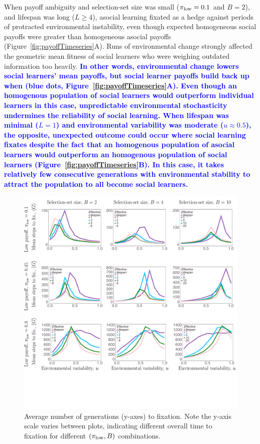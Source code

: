 \documentclass[letterpaper,11.5pt]{scrartcl}
\newcommand{\edit}[1]{{\bfseries \textcolor{blue} {#1}}}
\begin{document}
When payoff ambiguity and selection-set size was small ($\pi_{\mathrm{low}}=0.1$ and $B=2$), and lifespan was long ($L \geq 4$), asocial learning fixated as a hedge against periods of protracted environmental instability, even though expected
homogeneous social payoffs were greater than homogeneous asocial payoffs (Figure~\ref{fig:payoffTimeseries}A). Runs of environmental change strongly affected the geometric mean fitness of social learners who were weighing
outdated information too heavily. \edit{In other words, environmental change lowers social learners' mean payoffs, but social learner payoffs build back up when (blue dots, Figure~\ref{fig:payoffTimeseries}A).  Even though an homogenous population of social learners would outperform individual learners in this case, unpredictable environmental stochasticity undermines the reliability of social learning.  When lifespan was minimal ($L=1$) and environmental variability was moderate ($u\approx0.5$), the opposite, unexpected outcome could occur where social learning fixates despite the fact that an homogenous population of asocial learners would outperform an homogenous population of social learners (Figure~\ref{fig:payoffTimeseries}B). In this case, it takes relatively few consecutive generations with environmental stability to attract the population to all become social learners.}

\begin{figure}
  \caption{Average number of generations (y-axes) to fixation. 
    Note the y-axis scale varies between plots, indicating different overall 
    time to fixation for different $(\pi_{\mathrm{low}}, B)$ combinations.} 
  \label{fig:steps}
\centering
    \includegraphics[width=\textwidth]{Figures/stepResultsPlots.pdf}
\end{figure}
\end{document}

